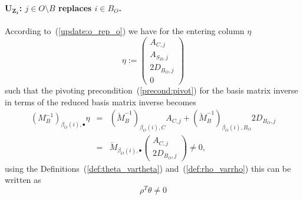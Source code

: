 \documentclass[a4paper]{article}
\begin{document}
\paragraph{$\mathbf{U_{Z_{1}}}$: $j \in O \setminus B$ replaces $i \in B_{O}$.}
According to~(\ref{update:o_rep_o}) we have for the entering column $\eta$
\begin{equation}
\eta:=
\left(
\begin{array}{c}
A_{C, j} \\
\hline
A_{S_{B},j} \\
\hline
2D_{B_{O}, j} \\
\hline
0
\end{array}
\right)
\end{equation}
such that the pivoting precondition~(\ref{precond:pivot})
for the basis matrix inverse in terms of
the reduced basis matrix inverse becomes
\begin{eqnarray}
\left(M_{B}^{-1}\right)_{\beta_{O}(i), \bullet} \eta
&=&
\left(\check{M}_{B}^{-1}\right)_{\beta_{O}(i),C}A_{C,j}
+\left(\check{M}_{B}^{-1}\right)_{\beta_{O}(i), B_{O}}2D_{B_{O},j}
\nonumber \\
&=&
\check{M}_{\beta_{O}(i), \bullet}
\left(
\begin{array}{c}
A_{C,j} \\
\hline
2D_{B_{O},j}
\end{array}
\right)
\neq 0,
\nonumber
\end{eqnarray}
using the Definitions~(\ref{def:theta_vartheta})
and~(\ref{def:rho_varrho}) this can be written as
\begin{equation}
\rho^{T}\theta \neq 0
\end{equation}
\end{document}
